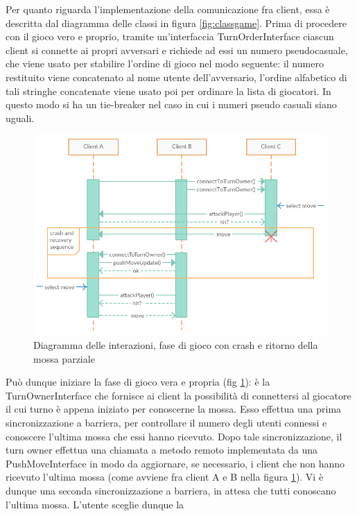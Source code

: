Per quanto riguarda l'implementazione della comunicazione fra client, essa è descritta dal
diagramma delle classi in figura \ref{fig:classgame}.
Prima di procedere con il gioco vero e proprio, tramite un'interfaccia 
TurnOrderInterface ciascun client si connette ai propri avversari e richiede ad 
essi un numero pseudocasuale, che viene usato per stabilire l'ordine di gioco 
nel modo seguente: il numero restituito viene concatenato al nome utente 
dell'avversario, l'ordine alfabetico di tali stringhe concatenate viene usato 
poi per ordinare la lista di giocatori. In questo modo si ha un tie-breaker nel 
caso in cui i numeri pseudo casuali siano uguali.
\\
\begin{figure}[!ht]
    \centering
    \includegraphics[scale=0.65,center]{core/imgs/UML/sequence/game.png}
    \caption{Diagramma delle interazioni, fase di gioco con crash e ritorno 
della mossa parziale}
    \label{fig:gameseq}
\end{figure}
Può dunque iniziare la fase di gioco vera e propria (fig \ref{fig:gameseq}): è 
la TurnOwnerInterface 
che fornisce ai client la possibilità di connettersi al giocatore il cui turno 
è appena iniziato per conoscerne la mossa. Esso effettua una prima 
sincronizzazione a barriera, per controllare il numero degli utenti connessi e 
conoscere l'ultima mossa che essi hanno ricevuto. Dopo tale sincronizzazione, 
il turn owner effettua una chiamata a metodo remoto implementata da una 
PushMoveInterface in modo da aggiornare, se necessario, i client che non hanno 
ricevuto l'ultima mossa (come avviene fra client A e B nella figura 
\ref{fig:gameseq}). Vi è dunque una seconda sincronizzazione a barriera, 
in attesa che tutti conoscano l'ultima mossa. L'utente sceglie dunque la 
